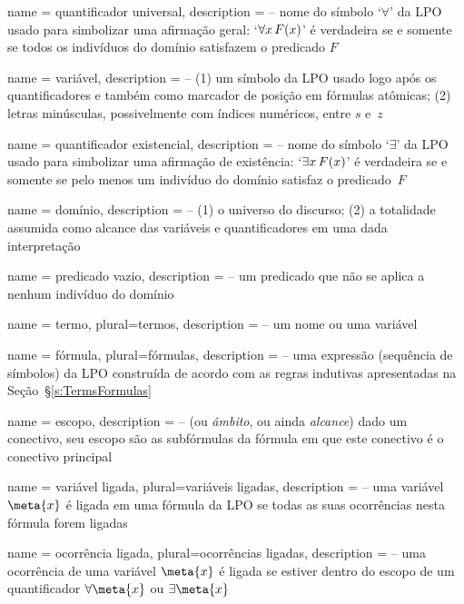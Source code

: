 {
 name = quantificador universal,
 description = {-- nome do símbolo `$\forall$' da LPO usado para simbolizar uma afirmação geral: `$\forall x\, \mathord{F}(x)$' é verdadeira se e somente se todos os indivíduos do domínio satisfazem o predicado $F$}
}

{
 name = variável,
 description = {-- (1) um símbolo da LPO usado logo após os quantificadores e também como marcador de posição em fórmulas atômicas; (2) letras minúsculas, possivelmente com índices numéricos, entre $s$ e~$z$}
}

{
 name = quantificador existencial,
 description = {-- nome do símbolo `$\exists$' da LPO usado para simbolizar uma afirmação de existência: `$\exists x\, \mathord{F}(x)$' é verdadeira se e somente se pelo menos um indivíduo do domínio satisfaz o predicado~$F$}
}

{
 name = domínio,
 description = {-- (1) o universo do discurso; (2) a totalidade assumida como alcance das variáveis e quantificadores em uma dada interpretação}
}

{
 name = {predicado vazio},
 description = {-- um predicado que não se aplica a nenhum indivíduo do domínio}
}

{
 name = termo,
 plural=termos,
 description = {-- um nome ou uma variável}
}

{
 name = fórmula,
 plural=fórmulas,
 description = {-- uma expressão (sequência de símbolos) da LPO construída de acordo com as regras indutivas apresentadas na Seção~\S\ref{s:TermsFormulas}}
}

{
 name = escopo,
 description = {-- (ou \textit{âmbito}, ou ainda \textit{alcance}) dado um conectivo, seu escopo são as subfórmulas da fórmula em que este conectivo é o conectivo principal}
}

{
 name = variável ligada,
 plural=variáveis ligadas,
 description = {-- uma variável $\meta{x}$ é ligada em uma fórmula da LPO se todas as suas ocorrências nesta fórmula forem ligadas}
}

{
 name = ocorrência ligada,
 plural=ocorrências ligadas,
 description = {-- uma ocorrência de uma variável $\meta{x}$ é ligada se estiver dentro do escopo de um quantificador $\forall{\meta{x}}$ ou $\exists{\meta{x}}$}
}

